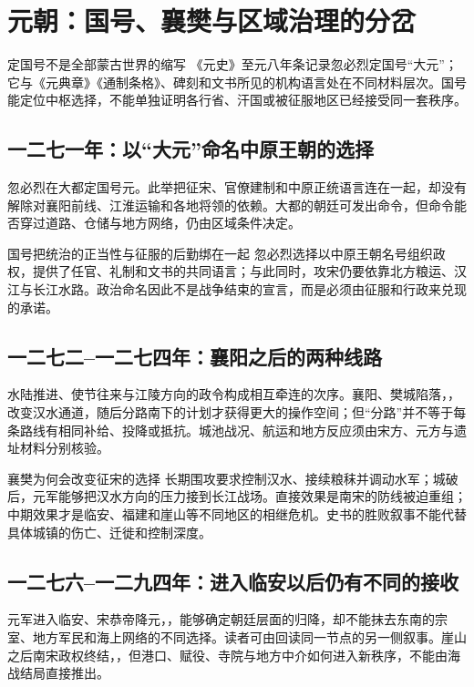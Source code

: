 \section{元朝：国号、襄樊与区域治理的分岔}

\begin{textwindow}{定国号不是全部蒙古世界的缩写}
《元史》至元八年条记录忽必烈定国号“大元”；它与《元典章》《通制条格》、碑刻和文书所见的机构语言处在不同材料层次。国号能定位中枢选择，不能单独证明各行省、汗国或被征服地区已经接受同一套秩序。
\end{textwindow}

\subsection{一二七一年：以“大元”命名中原王朝的选择}
忽必烈在大都定国号元。此举把征宋、官僚建制和中原正统语言连在一起，却没有解除对襄阳前线、江淮运输和各地将领的依赖。大都的朝廷可发出命令，但命令能否穿过道路、仓储与地方网络，仍由区域条件决定。

\begin{turningpoint}{国号把统治的正当性与征服的后勤绑在一起}
忽必烈选择以中原王朝名号组织政权，提供了任官、礼制和文书的共同语言；与此同时，攻宋仍要依靠北方粮运、汉江与长江水路。政治命名因此不是战争结束的宣言，而是必须由征服和行政来兑现的承诺。
\end{turningpoint}

\subsection{一二七二--一二七四年：襄阳之后的两种线路}
水陆推进、使节往来与江陵方向的政令构成相互牵连的次序。襄阳、樊城陷落，，改变汉水通道，随后分路南下的计划才获得更大的操作空间；但“分路”并不等于每条路线有相同补给、投降或抵抗。城池战况、航运和地方反应须由宋方、元方与遗址材料分别核验。

\begin{causalchain}{襄樊为何会改变征宋的选择}
长期围攻要求控制汉水、接续粮秣并调动水军；城破后，元军能够把汉水方向的压力接到长江战场。直接效果是南宋的防线被迫重组；中期效果才是临安、福建和崖山等不同地区的相继危机。史书的胜败叙事不能代替具体城镇的伤亡、迁徙和控制深度。
\end{causalchain}

\subsection{一二七六--一二九四年：进入临安以后仍有不同的接收}
元军进入临安、宋恭帝降元，，能够确定朝廷层面的归降，却不能抹去东南的宗室、地方军民和海上网络的不同选择。读者可由回读同一节点的另一侧叙事。崖山之后南宋政权终结，，但港口、赋役、寺院与地方中介如何进入新秩序，不能由海战结局直接推出。

